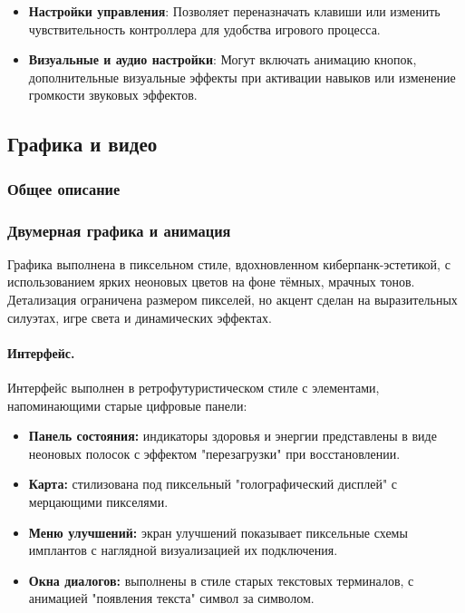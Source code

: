 \documentclass{article}
\begin{document}
\begin{itemize}
\begin{itemize}
    \item \textbf{Настройки управления}: Позволяет переназначать клавиши или изменить чувствительность контроллера для удобства игрового процесса.
    
    \item \textbf{Визуальные и аудио настройки}: Могут включать анимацию кнопок, дополнительные визуальные эффекты при активации навыков или изменение громкости звуковых эффектов.
\end{itemize}
\subsection{Графика и видео}

\subsubsection{Общее описание}


\subsubsection{Двумерная графика и анимация}

Графика выполнена в пиксельном стиле, вдохновленном киберпанк-эстетикой, с использованием ярких неоновых цветов на фоне тёмных, мрачных тонов. Детализация ограничена размером пикселей, но акцент сделан на выразительных силуэтах, игре света и динамических эффектах.

\paragraph{Интерфейс.}
Интерфейс выполнен в ретрофутуристическом стиле с элементами, напоминающими старые цифровые панели:
\begin{itemize}
    \item \textbf{Панель состояния:} индикаторы здоровья и энергии представлены в виде неоновых полосок с эффектом "перезагрузки" при восстановлении.
    \item \textbf{Карта:} стилизована под пиксельный "голографический дисплей" с мерцающими пикселями.
    \item \textbf{Меню улучшений:} экран улучшений показывает пиксельные схемы имплантов с наглядной визуализацией их подключения.
    \item \textbf{Окна диалогов:} выполнены в стиле старых текстовых терминалов, с анимацией "появления текста" символ за символом.
\end{itemize}


\end{itemize}
\end{document}
